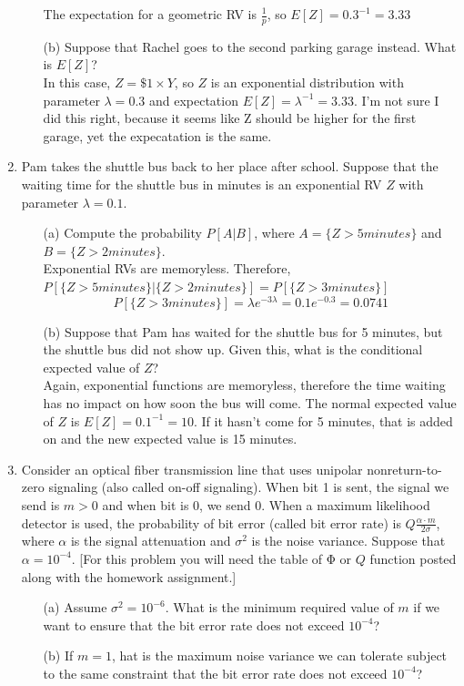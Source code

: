 \documentclass{report}
\begin{document}
\begin{enumerate}
\begin{itemize}
    The expectation for a geometric RV is $\frac{1}{p}$, so $E[Z] = 0.3^{-1} = 3.33$
\item[(b)] Suppose that Rachel goes to the second parking garage instead. What is $E[Z]$?\\
In this case, $Z = \$ 1 \times Y$, so $Z$ is an exponential distribution with parameter $ \lambda = 0.3$ and expectation $E[Z] = \lambda^{-1} = 3.33$. I'm not sure I did this right, because it seems like Z should be higher for the first garage, yet the expecatation is the same.
\end{itemize}
\item Pam takes the shuttle bus back to her place after school. Suppose that the waiting time for the shuttle
bus in minutes is an exponential RV $Z$ with parameter $\lambda = 0.1$.
\begin{itemize}
  \item[(a)] Compute the probability $P[A | B]$, where $A = \{Z > 5 minutes\}$ and $B = \{Z > 2 minutes\}$. \\
  Exponential RVs are memoryless. Therefore, $P[\{Z > 5 minutes\} | \{Z > 2 minutes\}] = P[\{Z > 3 minutes\}] $
  $$P[\{Z > 3 minutes\}] = \lambda e^{-3\lambda } = 0.1e^{-0.3} = 0.0741$$
  \item[(b)] Suppose that Pam has waited for the shuttle bus for 5 minutes, but the shuttle bus did not show
up. Given this, what is the conditional expected value of $Z$? \\
Again, exponential functions are memoryless, therefore the time waiting has no impact on how soon the bus will come. The normal expected value of $Z$ is $E[Z] = 0.1^{-1} = 10$. If it hasn't come for 5 minutes, that is added on and the
new expected value is 15 minutes.
\end{itemize}
\item Consider an optical fiber transmission line that uses unipolar nonreturn-to-zero signaling (also called
on-off signaling). When bit 1 is sent, the signal we send is $m > 0$ and when bit is 0, we send
0. When a maximum likelihood detector is used, the probability of bit error (called bit error rate) is $Q\frac{\alpha \cdot m}{ 2\sigma}$,
 where $\alpha$ is the signal attenuation and $\sigma^2$ is the noise variance. Suppose that $\alpha = 10^{−4}$. [For
this problem you will need the table of Φ or $Q$ function posted along with the homework assignment.]
\begin{itemize}
  \item[(a)] Assume $\sigma^2 = 10^{-6}$. What is the minimum required value of $m$ if we want to ensure that the bit error rate does not exceed $10^{-4}$?
  \item[(b)] If $m=1$, hat is the maximum noise  variance we can tolerate subject to the same constraint that the bit error rate does not exceed $10^{−4}$?


\end{itemize}
\end{enumerate}
\end{document}
